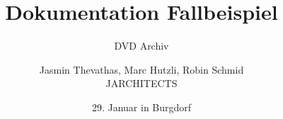 \documentclass[12pt,halfparskip]{scrreprt}
\title{Dokumentation Fallbeispiel}
\subtitle{DVD Archiv}
\author{Jasmin Thevathas, Marc Hutzli, Robin Schmid\\JARCHITECTS}
\date{29. Januar in Burgdorf}
\makeatletter
\let\title\@title
\let\author\@author
\let\date\@date
\let\subtitle\@subtitle
\makeatother
\begin{document}
\begin{titlepage}
    \begin{center}
        \vspace*{1cm}
        
        \Huge{\textbf{\title}}\\
        \vspace{2cm}
        \LARGE{\subtitle}

        \vspace{1.5cm}
        
        \large{\author}
        
        \vspace{1.5cm}

        \large{\date}
        \vfill
        
        \vspace{0.8cm}
                
    \end{center}
\end{titlepage}

\tableofcontents






\end{document}
